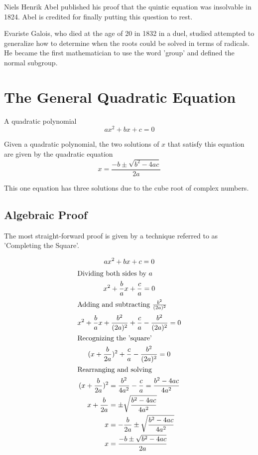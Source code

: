 \documentclass[a4paper]{article}
\begin{document}
\bigskip

Niels Henrik Abel published his proof that the quintic equation was insolvable in 1824.
Abel is credited for finally putting this question to rest.

\bigskip

Evariste Galois, who died at the age of 20 in 1832 in a duel, studied attempted to generalize how to determine when the roots could be solved in terms of radicals.
He became the first mathematician to use the word 'group' and defined the normal subgroup.

\section{The General Quadratic Equation}\label{eps:sec:quadratic}

\begin{definition}\label{eps:quad def}
  A quadratic polynomial
  \[
    ax^2 + bx + c = 0
  \]
\end{definition}

Given a quadratic polynomial, the two solutions of $x$ that satisfy this equation are given by the quadratic equation
\begin{equation}
  \boxed{
    x = \frac{-b \pm \sqrt{b^2 - 4ac}}{2a}
  }\label{eps:eq:equation}
\end{equation}

This one equation has three solutions due to the cube root of complex numbers.

\subsection{Algebraic Proof}\label{eps:subsec:algebraic-proof}
The most straight-forward proof is given by a technique referred to as 'Completing the Square'.

\begin{gather*}
  ax^2 + bx + c = 0\\
  \shortintertext{Dividing both sides by $a$}
  x^2 + \frac{b}{a}x + \frac{c}{a} = 0\\
  \shortintertext{Adding and subtracting $\frac{b^2}{(2a)^2}$}
  x^2 + \frac{b}{a}x + \frac{b^2}{(2a)^2} +  \frac{c}{a} - \frac{b^2}{(2a)^2} = 0\\
  \shortintertext{Recognizing the 'square'}
  (x+ \frac{b}{2a})^2 +  \frac{c}{a} - \frac{b^2}{(2a)^2} = 0\\
  \shortintertext{Rearranging and solving}
  \begin{alignedat}{2}
    (x + \frac{b}{2a})^2 & = \frac{b^2}{4a^2}-  \frac{c}{a}  = \frac{b^2-4ac}{4a^2} \\
    x + \frac{b}{2a}     & =\pm \sqrt{ \frac{b^2 - 4ac}{4a^2}}                      \\
    x                    & = - \frac{b}{2a} \pm \sqrt{ \frac{b^2 - 4ac}{4a^2}}      \\
    x                    & = \frac{-b \pm \sqrt{b^2 - 4ac}}{2a}                     \\
  \end{alignedat}
\end{gather*}
\end{document}
